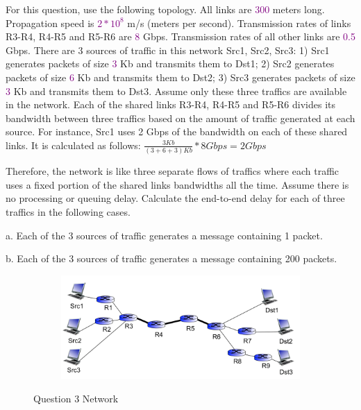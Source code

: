 \documentclass[12pt,a4paper]{article}
\begin{document}
For this question, use the following topology. All links are \textcolor{purple}{300} meters long. Propagation speed is \textcolor{purple}{$2*10^8$} m/s (meters per second). Transmission rates of links R3-R4, R4-R5 and R5-R6 are \textcolor{purple}{8} Gbps. Transmission rates of all other links are \textcolor{purple}{0.5} Gbps. There are 3 sources of traffic in this network Src1, Src2, Src3: 1) Src1 generates packets of size \textcolor{purple}{3} Kb and transmits them to Dst1; 2) Src2 generates packets of size \textcolor{purple}{6} Kb and transmits them to Dst2; 3) Src3 generates packets of size \textcolor{purple}{3} Kb and transmits them to Dst3. Assume only these three traffics are available in the network. Each of the shared links R3-R4, R4-R5 and R5-R6 divides its bandwidth between three traffics based on the amount of traffic generated at each source. For instance, Src1 uses 2 Gbps of the bandwidth on each of these shared links. It is calculated as follows:
$\frac{3Kb}{(3+6+3)Kb} * 8 Gbps = 2Gbps$

Therefore, the network is like three separate flows of traffics where each traffic uses a fixed portion of the shared links bandwidths all the time. Assume there is no processing or queuing delay. Calculate the end-to-end delay for each of three traffics in the following cases. 

a. Each of the 3 sources of traffic generates a message containing 1 packet.

b. Each of the 3 sources of traffic generates a message containing 200 packets.



\begin{figure}[h!]
  \centering
  \begin{subfigure}[b]{0.8\linewidth}
    \includegraphics[width=\linewidth]{q2.png}
    
  \end{subfigure}
  \caption{Question 3 Network}
  \label{fig:coffee}
\end{figure}
\end{document}

